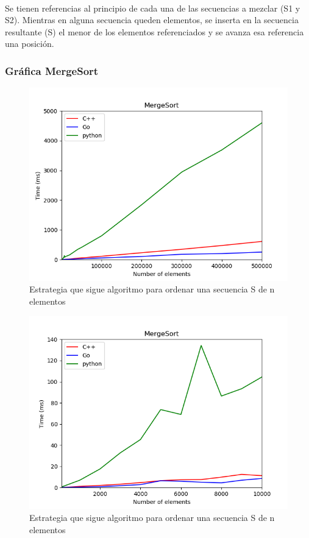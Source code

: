 \documentclass{article}
\begin{document}
    \paragraph {}
    Se tienen referencias al principio de cada una de las secuencias a mezclar (S1 y S2). Mientras en alguna secuencia queden elementos, se inserta en la secuencia resultante (S) el menor de los elementos referenciados y se avanza esa referencia una posición.
      \subsubsection{Gráfica MergeSort}
        \begin{figure}[h!]
            \centering
            \includegraphics[width=12cm]{img/mergeSort_1.png}
            \caption{Estrategia que sigue algoritmo para ordenar una secuencia S de n elementos}
            \label{fig:mergesort}
        \end {figure}
        \begin{figure}[h!]
            \centering
            \includegraphics[width=12cm]{img/mergeSort_2.png}
            \caption{Estrategia que sigue algoritmo para ordenar una secuencia S de n elementos}
            \label{fig:mergesort}
        \end {figure}
\end{document}
